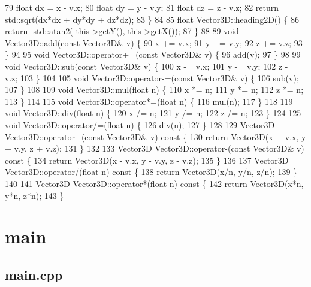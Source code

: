 \begin{DoxyCodeInclude}
79     \textcolor{keywordtype}{float} dx = x - v.x;
80     \textcolor{keywordtype}{float} dy = y - v.y;
81     \textcolor{keywordtype}{float} dz = z - v.z;
82     \textcolor{keywordflow}{return} std::sqrt(dx*dx + dy*dy + dz*dz);
83 \}
84 
85 \textcolor{keywordtype}{float} Vector3D::heading2D() \{
86     \textcolor{keywordflow}{return} -std::atan2(-this->getY(), this->getX());
87 \}
88 
89 \textcolor{keywordtype}{void} Vector3D::add(\textcolor{keyword}{const} Vector3D& v) \{
90     x += v.x;
91     y += v.y;
92     z += v.z;
93 \}
94 
95 \textcolor{keywordtype}{void} Vector3D::operator+=(\textcolor{keyword}{const} Vector3D& v) \{
96     add(v);
97 \}
98 
99 \textcolor{keywordtype}{void} Vector3D::sub(\textcolor{keyword}{const} Vector3D& v) \{
100     x -= v.x;
101     y -= v.y;
102     z -= v.z;
103 \}
104 
105 \textcolor{keywordtype}{void} Vector3D::operator-=(\textcolor{keyword}{const} Vector3D& v) \{
106     sub(v);
107 \}
108 
109 \textcolor{keywordtype}{void} Vector3D::mul(\textcolor{keywordtype}{float} n) \{
110     x *= n;
111     y *= n;
112     z *= n;
113 \}
114 
115 \textcolor{keywordtype}{void} Vector3D::operator*=(\textcolor{keywordtype}{float} n) \{
116     mul(n);
117 \}
118 
119 \textcolor{keywordtype}{void} Vector3D::div(\textcolor{keywordtype}{float} n) \{
120     x /= n;
121     y /= n;
122     z /= n;
123 \}
124 
125 \textcolor{keywordtype}{void} Vector3D::operator/=(\textcolor{keywordtype}{float} n) \{
126     div(n);
127 \}
128 
129 Vector3D Vector3D::operator+(\textcolor{keyword}{const} Vector3D& v)\textcolor{keyword}{ const }\{
130     \textcolor{keywordflow}{return} Vector3D(x + v.x, y + v.y, z + v.z);
131 \}
132 
133 Vector3D Vector3D::operator-(\textcolor{keyword}{const} Vector3D& v)\textcolor{keyword}{ const }\{
134     \textcolor{keywordflow}{return} Vector3D(x - v.x, y - v.y, z - v.z);
135 \}
136 
137 Vector3D Vector3D::operator/(\textcolor{keywordtype}{float} n)\textcolor{keyword}{ const }\{
138     \textcolor{keywordflow}{return} Vector3D(x/n, y/n, z/n);
139 \}
140 
141 Vector3D Vector3D::operator*(\textcolor{keywordtype}{float} n)\textcolor{keyword}{ const }\{
142     \textcolor{keywordflow}{return} Vector3D(x*n, y*n, z*n);
143 \}
\end{DoxyCodeInclude}
\hypertarget{_benchmark_program_BenchmarkProgramMain}{}\section{main}\label{_benchmark_program_BenchmarkProgramMain}
\hypertarget{_benchmark_program_BenchmarkProgramMainCPP}{}\subsection{main.\+cpp}\label{_benchmark_program_BenchmarkProgramMainCPP}

